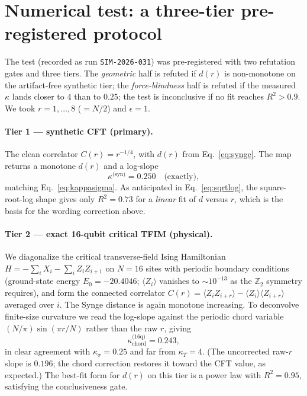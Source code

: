 \documentclass[11pt]{article}
\begin{document}
\section{Numerical test: a three-tier pre-registered protocol}
\label{sec:numerics}

The test (recorded as run \texttt{SIM-2026-031}) was pre-registered with two refutation
gates and three tiers. The \emph{geometric} half is refuted if $d(r)$ is non-monotone on the
artifact-free synthetic tier; the \emph{force-blindness} half is refuted if the measured
$\kappa$ lands closer to $4$ than to $0.25$; the test is inconclusive if no fit reaches
$R^{2}>0.9$. We took $r=1,\dots,8$ ($=N/2$) and $\epsilon=1$.

\paragraph{Tier 1 --- synthetic CFT (primary).}
The clean correlator $C(r)=r^{-1/4}$, with $d(r)$ from Eq.~\eqref{eq:synge}. The map returns
a monotone $d(r)$ and a log-slope
\begin{equation}
  \kappa^{\text{(syn)}} = 0.250 \quad\text{(exactly)},
\end{equation}
matching Eq.~\eqref{eq:kappasigma}. As anticipated in Eq.~\eqref{eq:sqrtlog}, the
square-root-log shape gives only $R^{2}=0.73$ for a \emph{linear} fit of $d$ versus $r$,
which is the basis for the wording correction above.

\paragraph{Tier 2 --- exact 16-qubit critical TFIM (physical).}
We diagonalize the critical transverse-field Ising Hamiltonian
$H=-\sum_i X_i-\sum_i Z_iZ_{i+1}$ on $N=16$ sites with periodic boundary conditions
(ground-state energy $E_0=-20.4046$; $\langle Z_i\rangle$ vanishes to $\sim10^{-13}$ as the
$\mathbb{Z}_2$ symmetry requires), and form the connected correlator
$C(r)=\langle Z_iZ_{i+r}\rangle-\langle Z_i\rangle\langle Z_{i+r}\rangle$ averaged over $i$.
The Synge distance is again monotone increasing. To deconvolve finite-size curvature we read
the log-slope against the periodic chord variable $(N/\pi)\sin(\pi r/N)$ rather than the raw
$r$, giving
\begin{equation}
  \kappa^{\text{(16q)}}_{\mathrm{chord}} = 0.243 ,
\end{equation}
in clear agreement with $\kappa_\sigma=0.25$ and far from $\kappa_T=4$. (The uncorrected
raw-$r$ slope is $0.196$; the chord correction restores it toward the CFT value, as
expected.) The best-fit form for $d(r)$ on this tier is a power law with $R^{2}=0.95$,
satisfying the conclusiveness gate.
\end{document}
